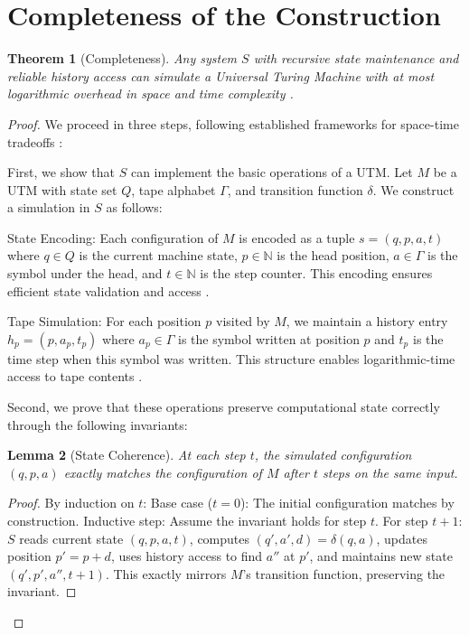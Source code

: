 \documentclass[12pt]{article}
\newtheorem{theorem}{Theorem}
\newtheorem{lemma}[theorem]{Lemma}
\begin{document}
\section{Completeness of the Construction}

\begin{theorem}[Completeness]
Any system $S$ with recursive state maintenance and reliable history access can simulate a Universal Turing Machine with at most logarithmic overhead in space and time complexity \cite{boyle2024memory,liskiewicz1994complexity}.
\end{theorem}

\begin{proof}
We proceed in three steps, following established frameworks for space-time tradeoffs \cite{swamy1983space,hu2014computational}:

First, we show that $S$ can implement the basic operations of a UTM. Let $M$ be a UTM with state set $Q$, tape alphabet $\Gamma$, and transition function $\delta$. We construct a simulation in $S$ as follows:

State Encoding: Each configuration of $M$ is encoded as a tuple $s = (q, p, a, t)$ where $q \in Q$ is the current machine state, $p \in \mathbb{N}$ is the head position, $a \in \Gamma$ is the symbol under the head, and $t \in \mathbb{N}$ is the step counter. This encoding ensures efficient state validation and access \cite{boyle2024memory,hu2014computational}.

Tape Simulation: For each position $p$ visited by $M$, we maintain a history entry $h_p = (p, a_p, t_p)$ where $a_p \in \Gamma$ is the symbol written at position $p$ and $t_p$ is the time step when this symbol was written. This structure enables logarithmic-time access to tape contents \cite{swamy1983space,liskiewicz1994complexity}.

Second, we prove that these operations preserve computational state correctly through the following invariants:

\begin{lemma}[State Coherence]
At each step $t$, the simulated configuration $(q, p, a)$ exactly matches the configuration of $M$ after $t$ steps on the same input.
\end{lemma}

\begin{proof}
By induction on $t$:
Base case ($t=0$): The initial configuration matches by construction.
Inductive step: Assume the invariant holds for step $t$. For step $t+1$: $S$ reads current state $(q, p, a, t)$, computes $(q', a', d) = \delta(q, a)$, updates position $p' = p + d$, uses history access to find $a''$ at $p'$, and maintains new state $(q', p', a'', t+1)$. This exactly mirrors $M$'s transition function, preserving the invariant.
\end{proof}


\end{proof}
\end{document}
